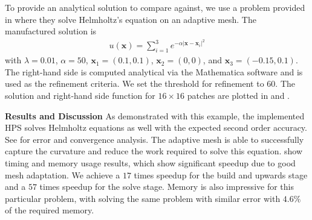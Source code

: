 To provide an analytical solution to compare against, we use a problem provided in \citep{cheng2006adaptive} where they solve Helmholtz's equation on an adaptive mesh. The manufactured solution is
\begin{align}
    u(\textbf{x}) = \sum_{i=1}^{3} e^{-\alpha |\textbf{x} - \textbf{x}_i|^2}
\end{align}
with $\lambda=0.01$, $\alpha=50$, $\textbf{x}_1 = (0.1, 0.1)$, $\textbf{x}_2 = (0, 0)$, and $\textbf{x}_3 = (-0.15, 0.1)$. The right-hand side is computed analytical via the Mathematica software \citep{Mathematica} and is used as the refinement criteria. We set the threshold for refinement to $60$. The solution and right-hand side function for $16 \times 16$ patches are plotted in  and .

{\bf Results and Discussion}
As demonstrated with this example, the implemented HPS solves Helmholtz equations as well with the expected second order accuracy. See  for error and convergence analysis. The adaptive mesh is able to successfully capture the curvature and reduce the work required to solve this equation.  show timing and memory usage results, which show significant speedup due to good mesh adaptation. We achieve a $17$ times speedup for the build and upwards stage and a $57$ times speedup for the solve stage. Memory is also impressive for this particular problem, with solving the same problem with similar error with $4.6\%$ of the required memory.


